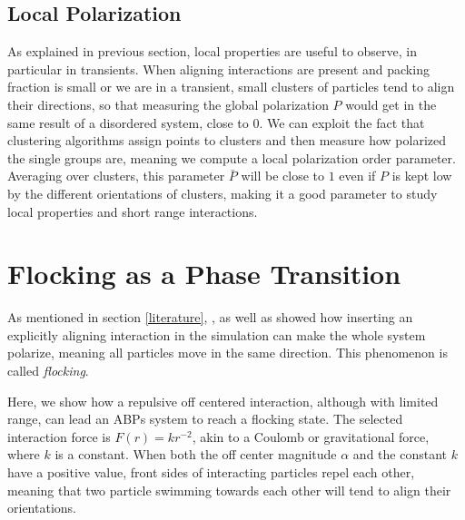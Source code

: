\documentclass[../../master_thesis_np.tex]{subfiles}
\begin{document}
		\subsection{Local Polarization}
		As explained in previous section, local properties are useful to observe, in particular in transients. 
		When aligning interactions are present and packing fraction is small or we are in a transient, small clusters of particles tend to align their directions, so that measuring the global polarization $P$ would get in the same result of a disordered system, close to $0$. 
		We can exploit the fact that clustering algorithms assign points to clusters and then measure how polarized the single groups are, meaning we compute a local polarization order parameter. 
		Averaging over clusters, this parameter $\bar{P}$ will be close to $1$ even if $P$ is kept low by the different orientations of clusters, making it a good parameter to study local properties and short range interactions.
		
		\section{Flocking as a Phase Transition}
		As mentioned in section \ref{literature}, \citeauthor{martin-gomez_collective_2018}, as well as \citeauthor{negi_emergent_2022} showed how inserting an explicitly aligning interaction in the simulation can make the whole system polarize, meaning all particles move in the same direction. 
		This phenomenon is called \emph{flocking}.
		
		Here, we show how a repulsive off centered interaction, although with limited range, can lead an ABPs system to reach a flocking state. 
		The selected interaction force is $F(r) = kr^{-2}$, akin to a Coulomb or gravitational force, where $k$ is a constant. 
		When both the off center magnitude $\alpha$ and the constant $k$ have a positive value, front sides of interacting particles repel each other, meaning that two particle swimming towards each other will tend to align their orientations. 
		
\end{document}
